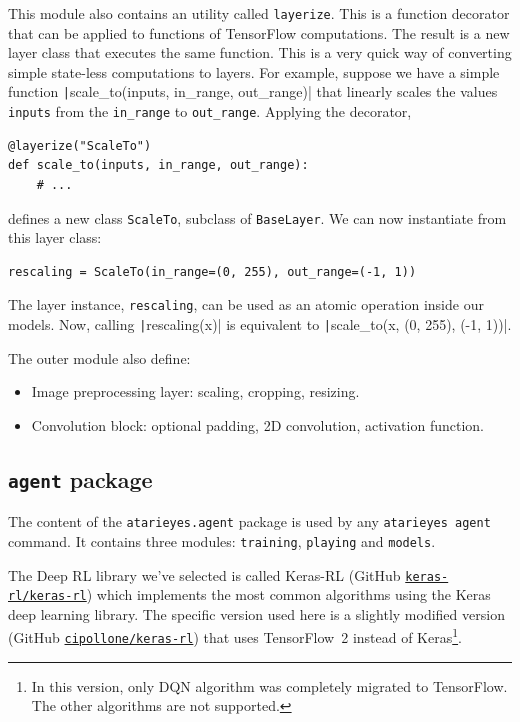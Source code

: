 This module also contains an utility called \texttt{layerize}. This is a
function decorator that can be applied to functions of TensorFlow
computations. The result is a new layer class that executes the same function.
This is a very quick way of converting simple state-less computations to
layers. For example, suppose we have a simple function
\texttt|scale_to(inputs, in_range, out_range)| that
linearly scales the values \texttt{inputs} from the \verb|in_range| to
\verb|out_range|. Applying the decorator,
\begin{verbatim}
@layerize("ScaleTo")
def scale_to(inputs, in_range, out_range):
	# ...
\end{verbatim}
defines a new class \texttt{ScaleTo}, subclass of \texttt{BaseLayer}. We can
now instantiate from this layer class:
\begin{verbatim}
rescaling = ScaleTo(in_range=(0, 255), out_range=(-1, 1))
\end{verbatim}
The layer instance, \texttt{rescaling}, can be used as an atomic operation
inside our models. Now, calling \texttt|rescaling(x)| is
equivalent to \texttt|scale_to(x, (0, 255), (-1, 1))|.

The outer module also define:
\begin{itemize}
	\item Image preprocessing layer: scaling, cropping, resizing.
	\item Convolution block: optional padding, 2D convolution, activation
		function.
\end{itemize}

\subsection{\texttt{agent} package}

\label{sec:impl-agent}

The content of the \verb|atarieyes.agent| package is used by any
\verb|atarieyes agent| command. It contains three modules: \texttt{training},
\texttt{playing} and \texttt{models}.

The Deep RL library we've selected is called Keras-RL (GitHub
\href{https://github.com/keras-rl/keras-rl}{\texttt{keras-rl/keras-rl}})
which implements the most common algorithms using the Keras deep learning
library. The specific version used here is a slightly modified version (GitHub
\href{https://github.com/cipollone/keras-rl}{\texttt{cipollone/keras-rl}})
that uses TensorFlow~2 instead of Keras\footnote{In this version, only DQN
algorithm was completely migrated to TensorFlow. The other algorithms are not
supported.}.


